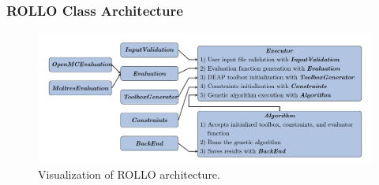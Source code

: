 \begin{frame}
    \frametitle{ROLLO Class Architecture}
    \begin{figure}
        \centering
        \includegraphics[width=\linewidth]{figures/rollo-architecture.png} 
        \caption{Visualization of ROLLO architecture.}
    \end{figure}
\end{frame}